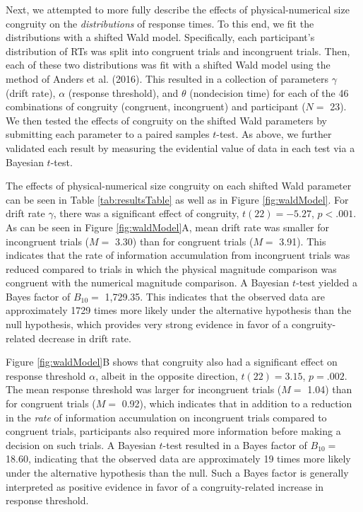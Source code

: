 \documentclass[english,,man]{apa6}
\theoremstyle{definition}
\theoremstyle{definition}
\theoremstyle{definition}
\theoremstyle{remark}
\begin{document}
Next, we attempted to more fully describe the effects of
physical-numerical size congruity on the \emph{distributions} of
response times. To this end, we fit the distributions with a shifted
Wald model. Specifically, each participant's distribution of RTs was
split into congruent trials and incongruent trials. Then, each of these
two distributions was fit with a shifted Wald model using the method of
Anders et al. (2016). This resulted in a collection of parameters
\(\gamma\) (drift rate), \(\alpha\) (response threshold), and \(\theta\)
(nondecision time) for each of the 46 combinations of congruity
(congruent, incongruent) and participant (\(N=\) 23). We then tested the
effects of congruity on the shifted Wald parameters by submitting each
parameter to a paired samples \(t\)-test. As above, we further validated
each result by measuring the evidential value of data in each test via a
Bayesian \(t\)-test.

The effects of physical-numerical size congruity on each shifted Wald
parameter can be seen in Table \ref{tab:resultsTable} as well as in
Figure \ref{fig:waldModel}. For drift rate \(\gamma\), there was a
significant effect of congruity, \(t(22) = -5.27\), \(p < .001\). As can
be seen in Figure \ref{fig:waldModel}A, mean drift rate was smaller for
incongruent trials (\(M=\) 3.30) than for congruent trials (\(M=\)
3.91). This indicates that the rate of information accumulation from
incongruent trials was reduced compared to trials in which the physical
magnitude comparison was congruent with the numerical magnitude
comparison. A Bayesian \(t\)-test yielded a Bayes factor of \(B_{10}=\)
1,729.35. This indicates that the observed data are approximately 1729
times more likely under the alternative hypothesis than the null
hypothesis, which provides very strong evidence in favor of a
congruity-related decrease in drift rate.

Figure \ref{fig:waldModel}B shows that congruity also had a significant
effect on response threshold \(\alpha\), albeit in the opposite
direction, \(t(22) = 3.15\), \(p = .002\). The mean response threshold
was larger for incongruent trials (\(M=\) 1.04) than for congruent
trials (\(M=\) 0.92), which indicates that in addition to a reduction in
the \emph{rate} of information accumulation on incongruent trials
compared to congruent trials, participants also required more
information before making a decision on such trials. A Bayesian
\(t\)-test resulted in a Bayes factor of \(B_{10}=\) 18.60, indicating
that the observed data are approximately 19 times more likely under the
alternative hypothesis than the null. Such a Bayes factor is generally
interpreted as positive evidence in favor of a congruity-related
increase in response threshold.
\end{document}
